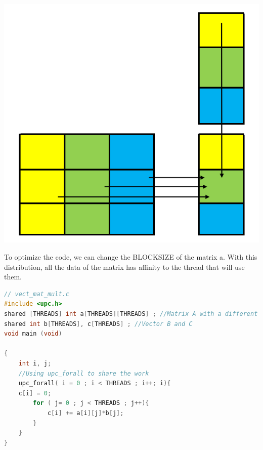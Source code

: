 \documentclass{report}
\begin{document}
\begin{center}
    \includegraphics[scale=0.5]{Images/Matrix_vector_unoptimized.png}
    \label{fig1}
\end{center}

To optimize the code, we can change the BLOCKSIZE of the matrix a. With this distribution, all the data of the matrix has affinity to the thread that will use them.

\begin{lstlisting}[language=C]
// vect_mat_mult.c
#include <upc.h>
shared [THREADS] int a[THREADS][THREADS] ; //Matrix A with a different blocksize
shared int b[THREADS], c[THREADS] ; //Vector B and C
void main (void) 

{
    int i, j; 
    //Using upc_forall to share the work
    upc_forall( i = 0 ; i < THREADS ; i++; i){
    c[i] = 0;
        for ( j= 0 ; j < THREADS ; j++){
            c[i] += a[i][j]*b[j];
        }
    }
}
\end{lstlisting}
\end{document}
